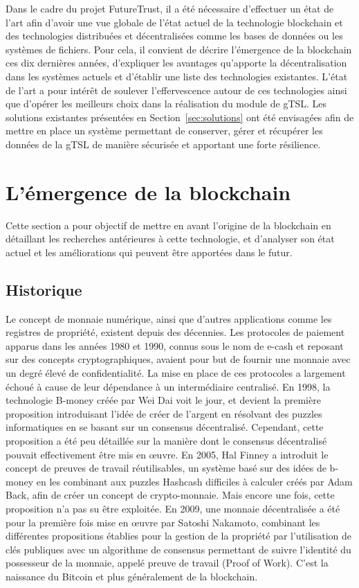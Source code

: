 \documentclass{tnreport}
\begin{document}
Dans le cadre du projet FutureTrust, il a été nécessaire d'effectuer un état de l'art afin d'avoir une vue globale de l'état actuel de la technologie blockchain et des technologies distribuées et décentralisées comme les bases de données ou les systèmes de fichiers. Pour cela, il convient de décrire l'émergence de la blockchain ces dix dernières années, d'expliquer les avantages qu'apporte la décentralisation dans les systèmes actuels et d'établir une liste des technologies existantes. L'état de l'art a pour intérêt de soulever l'effervescence autour de ces technologies ainsi que d'opérer les meilleurs choix dans la réalisation du module de gTSL. Les solutions existantes présentées en Section~\ref{sec:solutions} ont été envisagées afin de mettre en place un système permettant de conserver, gérer et récupérer les données de la gTSL de manière sécurisée et apportant une forte résilience.

\section{L'émergence de la blockchain}

Cette section a pour objectif de mettre en avant l'origine de la blockchain en détaillant les recherches antérieures à cette technologie, et d'analyser son état actuel et les améliorations qui peuvent être apportées dans le futur.

\subsection{Historique}

Le concept de monnaie numérique, ainsi que d'autres applications comme les registres de propriété, existent depuis des décennies. 
Les protocoles de paiement apparus dans les années 1980 et 1990, connus sous le nom de e-cash\cite{ecash} et reposant sur des concepts cryptographiques, avaient pour but de fournir une monnaie avec un degré élevé de confidentialité. La mise en place de ces protocoles a largement échoué à cause de leur dépendance à un intermédiaire centralisé. 
En 1998, la technologie B-money\cite{bmoney} créée par Wei Dai voit le jour, et devient la première proposition introduisant l'idée de créer de l'argent en résolvant des puzzles informatiques en se basant sur un consensus décentralisé. Cependant, cette proposition a été peu détaillée sur la manière dont le consensus décentralisé pouvait effectivement être mis en œuvre. 
En 2005, Hal Finney a introduit le concept de preuves de travail réutilisables, un système basé sur des idées de b-money en les combinant aux puzzles Hashcash\cite{hashcash} difficiles à calculer créés par Adam Back, afin de créer un concept de crypto-monnaie. Mais encore une fois, cette proposition n'a pas su être exploitée. 
En 2009, une monnaie décentralisée a été pour la première fois mise en œuvre par Satoshi Nakamoto, combinant les différentes propositions établies pour la gestion de la propriété par l'utilisation de clés publiques avec un algorithme de consensus permettant de suivre l'identité du possesseur de la monnaie, appelé preuve de travail (Proof of Work). C'est la naissance du Bitcoin et plus généralement de la blockchain.
\end{document}
